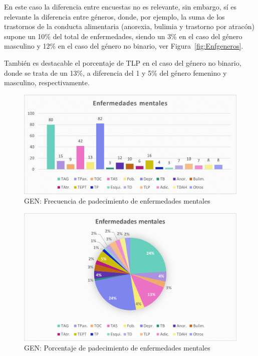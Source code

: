 \documentclass[12pt, a4paper,twoside,titlepage]{book}
\begin{document}
En este caso la diferencia entre encuestas no es relevante, sin embargo, sí es relevante la diferencia entre géneros, donde, por ejemplo, la suma de los trastornos de la conducta alimentaria (anorexia, bulimia y trastorno por atracón) supone un 10\% del total de enfermedades, siendo un 3\% en el caso del género masculino y 12\% en el caso del género no binario, ver Figura~\ref{fig:Enfgeneros}.

También es destacable el porcentaje de TLP en el caso del género no binario, donde se trata de un 13\%, a diferencia del 1 y 5\% del género femenino y masculino, respectivamente. 



\begin{figure}
\centering
 \includegraphics[width=.9\linewidth]{Imagenes Form GEN/21GENEnf}
 \caption{GEN: Frecuencia de padecimiento de enfermedades mentales}
 \label{fig:Frecenf}
 \end{figure}

\begin{figure}
\centering
 \includegraphics[width=.9\linewidth]{Imagenes Form GEN/22GENEnf} 
 \caption{GEN: Porcentaje de padecimiento de enfermedades mentales}
 \label{fig:Porenf}
 \end{figure}
 
 
\end{document}
